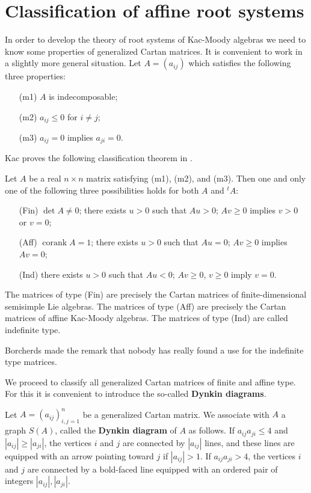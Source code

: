 \documentclass[12pt]{article}
\begin{document}
\section{Classification of affine root systems}
In order to develop the theory of root systems of Kac-Moody algebras we need to know some properties of generalized Cartan matrices. It is convenient to work in a slightly more general situation. Let $A = (a_{ij})$ which satisfies the following three properties:
\begin{itemize}
    \item[(m1)] $A$ is indecomposable;
    \item[(m2)] $a_{ij} \leq 0$ for $i \neq j$;
    \item[(m3)] $a_{ij} = 0$ implies $a_{ji} = 0$.
\end{itemize}
Kac proves the following classification theorem in \cite{kac}.
\begin{theorem}
    Let $A$ be a real $n \times n$ matrix satisfying (m1), (m2), and (m3). Then one and only one of the following three possibilities holds for both $A$ and ${}^t A$:
    \begin{itemize}
        \item[(Fin)] $\det A \neq 0$; there exists $u > 0$ such that $Au > 0$; $Av \geq 0$ implies $v > 0$ or $v = 0$;
        \item[(Aff)] $\operatorname{corank} A = 1$; there exists $u > 0$ such that $Au = 0$; $Av \geq 0$ implies $Av = 0$;
        \item[(Ind)] there exists $u > 0$ such that $Au < 0$; $Av \geq 0$, $v \geq 0$ imply $v = 0$.
    \end{itemize}
\end{theorem}

\begin{remark}
    The matrices of type (Fin) are precisely the Cartan matrices of finite-dimensional semisimple Lie algebras. The matrices of type (Aff) are precisely the Cartan matrices of affine Kac-Moody algebras. The matrices of type (Ind) are called indefinite type.

    Borcherds made the remark that nobody has really found a use for the indefinite type matrices.
\end{remark}

We proceed to classify all generalized Cartan matrices of finite and affine type.
For this it is convenient to introduce the so-called \textbf{Dynkin diagrams}.
\begin{definition}
    Let $A=(a_{ij})_{i,j=1}^n$ be a generalized Cartan matrix.  We associate with $A$ a graph $S(A)$, called the \textbf{Dynkin diagram} of $A$ as follows. If $a_{ij}a_{ji}\leq 4$ and $|a_{ij}|\geq |a_{ji}|$, the vertices $i$ and $j$ are connected by $|a_{ij}|$ lines, and these lines are equipped with an arrow pointing toward $j$ if $|a_{ij}|>1$.
    If $a_{ij}a_{ji}>4$, the vertices $i$ and $j$ are connected by a bold-faced line
    equipped with an ordered pair of integers $|a_{ij}|,|a_{ji}|$.
\end{definition}
\end{document}
